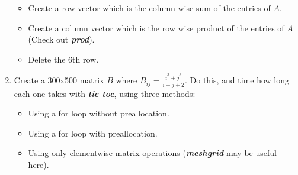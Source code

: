 \documentclass{article}
\begin{document}
\begin{enumerate}
\begin{itemize}
		\item Create a row vector which is the column wise sum of the entries of $A$.
		\item Create a column vector which is the row wise product of the entries of $A$ (Check out \textbf{\textit{prod}}).
		\item Delete the 6th row.
	\end{itemize}
\item Create a 300x500 matrix $B$ where $B_{ij} = \frac{i^3+j^3}{i+j+2}$. Do this, and time how long each one takes with \textbf{\textit{tic toc}}, using three methods:
	\begin{itemize}
		\item Using a for loop without preallocation.
		\item Using a for loop with preallocation.
		\item Using only elementwise matrix operations (\textbf{\textit{meshgrid}} may be useful here).
	\end{itemize}
\end{enumerate}
\end{document}
